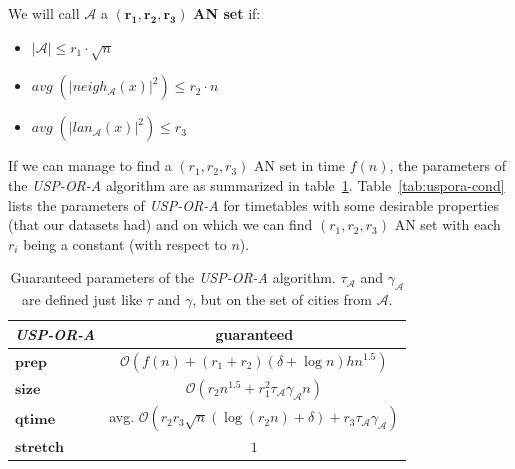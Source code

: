 \documentclass{svk_long_en}
\begin{document}
		\newpage
		We will call $\mathcal{A}$ a $\bm{(r_{1}, r_{2}, r_{3})}$ \textbf{AN set} if:
		\begin{itemize}
			\item $|\mathcal{A}| \leq r_{1} \cdot \sqrt{n}$
			\item $avg \; (|neigh_{\mathcal{A}}(x)|^{2}) \leq r_{2} \cdot n$
			\item $avg \; (|lan_{\mathcal{A}}(x)|^{2}) \leq r_{3}$
		\end{itemize}
		\hspace{\fill}
		
		If we can manage to find a $(r_{1}, r_{2}, r_{3})$ AN set in time $f(n)$, the parameters of the \textit{USP-OR-A} algorithm are as summarized in table~\ref{tab:uspora-guar}. Table~\ref{tab:uspora-cond} lists the parameters of \textit{USP-OR-A} for timetables with some desirable properties (that our datasets had) and on which we can find $(r_{1}, r_{2}, r_{3})$ AN set with each $r_{i}$ being a constant (with respect to $n$).
		
		\begin{table}[H]
			\centering
			\footnotesize
			\begin{tabular}{l|c}
				\cellcolor{oracle-clr} \textit{\textbf{USP-OR-A}} & 
				\cellcolor{oracle-clr} \textbf{guaranteed} \\
				\hline
				\cellcolor{oracle-clr} $\bm{prep}$ & $\mathcal{O}(f(n) + (r_{1} + r_{2}) (\delta + \log n) h n^{1.5})$ \\
				\cellcolor{oracle-clr} $\bm{size}$ & $\mathcal{O}(r_{2} n^{1.5} + r_{1}^{2} \tau_{\mathcal{A}} \gamma_{\mathcal{A}} n)$ \\
				\cellcolor{oracle-clr} $\bm{qtime}$ & avg. $\mathcal{O}(r_{2} r_{3} \sqrt{n} (\log (r_{2}n) + \delta) + r_{3} \tau_{\mathcal{A}} \gamma_{\mathcal{A}})$ \\
				\cellcolor{oracle-clr} $\bm{stretch}$ & $1$ \\
			\end{tabular}
			\caption{\label{tab:uspora-guar} Guaranteed parameters of the \textit{USP-OR-A} algorithm. $\tau_{\mathcal{A}}$ and $\gamma_{\mathcal{A}}$ are defined just like $\tau$ and $\gamma$, but on the set of cities from $\mathcal{A}$.}
		\end{table}
		
\end{document}
